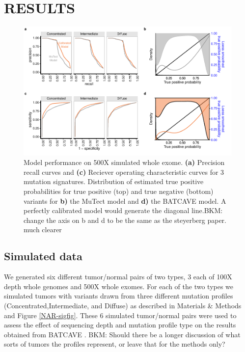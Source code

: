 \documentclass[a4,center,fleqn]{NAR}
\newcommand{\bkmcomment}[1]{{\color{blue}BKM: #1}}
\newcommand{\batcave}{BATCAVE }
\begin{document}
\section{RESULTS}
\begin{figure}
  \begin{center}
  \includegraphics{figures/fig2.pdf}
  \end{center}
  \caption{Model performance on 500X simulated whole exome.
  \textbf{(a)} Precision recall curves and \textbf{(c)} Reciever operating characteristic curves for 3 mutation signatures.
  Distribution of estimated true positive probabilities for true positive (top) and true negative (bottom) variants for \textbf{b)} the MuTect model and \textbf{d)} the \batcave model.
  A perfectly calibrated model would generate the diagonal line.\bkmcomment{change the axis on b and d to be the same as the steyerberg paper. much clearer}}
\label{NAR-wes_fig}
\end{figure}

\subsection{Simulated data}
We generated six different tumor/normal pairs of two types, 3 each of 100X depth whole genomes and 500X whole exomes.
For each of the two types we simulated tumors with variants drawn from three different mutation profiles (Concentrated,Intermediate, and Diffuse) as described in Materials \& Methods and Figure \ref{NAR-sigfig}.
These 6 simulated tumor/normal pairs were used to assess the effect of sequencing depth and mutation profile type on the results obtained from \batcave.
\bkmcomment{Should there be a longer discussion of what sorts of tumors the profiles represent, or leave that for the methods only?}
\end{document}
